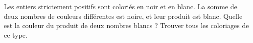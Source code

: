 Les entiers strictement positifs sont coloriés en noir et en blanc. La somme de deux nombres de couleurs différentes est noire, et leur produit est blanc. Quelle est la couleur du produit de deux nombres blancs ? Trouver tous les coloriages de ce type.
